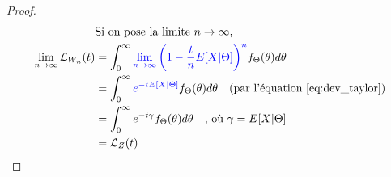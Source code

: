 \begin{proof}
\begin{align*}
	& \text{Si on pose la limite $n \to \infty$,} \\
\lim_{n \to \infty} \mathcal{L}_{W_n}(t)	& = \int_{0}^{\infty} \textcolor{blue}{\lim_{n \to \infty} \left(1 - \frac{t}{n} E[X|\Theta] \right)^n} f_\Theta (\theta) d \theta \\
	& = \int_{0}^{\infty} \textcolor{blue}{e^{-t E[X|\Theta]}} f_\Theta (\theta) d \theta \quad \text{(par l'équation \eqref{eq:dev_taylor})} \\
	& = \int_{0}^{\infty} e^{-t \gamma} f_\Theta (\theta) d \theta \quad \text{, où } \gamma = E[X|\Theta] \\
	& = \mathcal{L}_Z(t) \\ 
\end{align*}
\end{proof}
